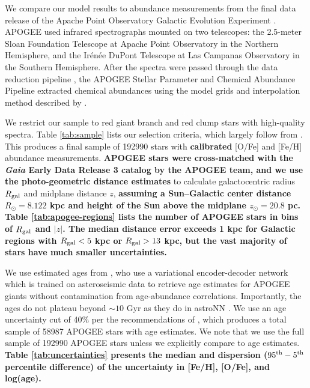\documentclass[twocolumn,twocolappendix,linenumbers]{aastex631}
\newcommand{\samplesize}{\num{192990}\xspace}
\newcommand{\agesamplesize}{\num{58987}\xspace}
\begin{document}
We compare our model results to abundance measurements from the final data release \citep[DR17;][]{Abdurro'uf2022-SDSSIV-DR17} of the Apache Point Observatory Galactic Evolution Experiment \citep[APOGEE;][]{Majewski2017-APOGEE}. APOGEE used infrared spectrographs \citep{Wilson2019-APOGEE-Spectrographs} mounted on two telescopes: the 2.5-meter Sloan Foundation Telescope \citep{Gunn2006-SloanTelescope} at Apache Point Observatory in the Northern Hemisphere, and the Ir{\'e}n{\'e}e DuPont Telescope \citep{BowenVaughan1973-DuPontTelescope} at Las Campanas Observatory in the Southern Hemisphere. After the spectra were passed through the data reduction pipeline \citep{Nidever2015-APOGEE-DataReduction}, the APOGEE Stellar Parameter and Chemical Abundance Pipeline \citep[ASPCAP;][]{Holtzmann2015-ASPCAP,GarciaPerez2016-ASPCAP} extracted chemical abundances using the model grids and interpolation method described by \citet{Jonsson2020-APOGEE-DR16}.

We restrict our sample to red giant branch and red clump stars with high-quality spectra. Table \ref{tab:sample} lists our selection criteria, which largely follow from \citet{Hayden2015-ChemicalCartography}. This produces a final sample of \samplesize stars with {\bf calibrated} [O/Fe] and [Fe/H] abundance measurements. 
{\bf APOGEE stars were cross-matched with the {\it Gaia} Early Data Release 3 catalog \citep{Gaia2016-Mission,Gaia2021-EDR3} by the APOGEE team, and we use the \citet{Bailer-Jones2021-GaiaDistances} photo-geometric distance estimates}
to calculate galactocentric radius $R_{\rm gal}$ and midplane distance $z$, {\bf assuming a Sun--Galactic center distance $R_\odot=8.122$ kpc and height of the Sun above the midplane $z_\odot=20.8$ pc. Table \ref{tab:apogee-regions} lists the number of APOGEE stars in bins of $R_{\rm gal}$ and $|z|$. The median distance error exceeds 1 kpc for Galactic regions with $R_{\rm gal}<5$ kpc or $R_{\rm gal}>13$ kpc, but the vast majority of stars have much smaller uncertainties.}

We use estimated ages from \citet[][hereafter ]{Leung2023-Ages}, who use a variational encoder-decoder network which is trained on asteroseismic data to retrieve age estimates for APOGEE giants without contamination from age-abundance correlations. Importantly, the  ages do not plateau beyond $\sim10$ Gyr as they do in astroNN \citep{Mackereth2019-astroNN-Ages}. We use an age uncertainty cut of 40\% per the recommendations of , which produces a total sample of \agesamplesize APOGEE stars with age estimates. We note that we use the full sample of \samplesize APOGEE stars unless we explicitly compare to age estimates. {\bf Table \ref{tab:uncertainties} presents the median and dispersion ($95^{\rm th} - 5^{\rm th}$ percentile difference) of the uncertainty in [Fe/H], [O/Fe], and log(age).}
\end{document}
